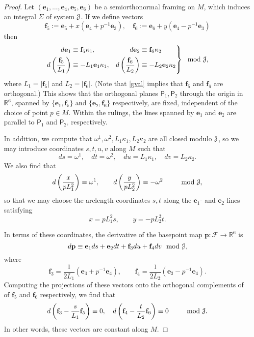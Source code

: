 \documentclass[12pt,reqno]{amsart}
\theoremstyle{definition}
\theoremstyle{remark}
\begin{document}
\begin{proof}
 Let $({\mathbf e}_1, \ldots, {\mathbf e}_4, {\mathbf e}_5, {\mathbf e}_6)$ be a semiorthonormal
framing on $M$, which induces an integral $\Sigma$ of system ${{\EuScript J}}$.
If we define vectors
$${\mathbf f}_5:={\mathbf e}_5 + x({\mathbf e}_4+p^{-1}{\mathbf e}_3),\quad {\mathbf f}_6:= {\mathbf e}_6+y({\mathbf e}_4-p^{-1}{\mathbf e}_3)$$
then
$$\left.
\begin{aligned}
d{\mathbf e}_1 &\equiv {\mathbf f}_5 \kappa_1, & d{\mathbf e}_2 &\equiv {\mathbf f}_6 \kappa_2\\
d\left(\dfrac{{\mathbf f}_5}{L_1}\right) &\equiv -L_1 {\mathbf e}_1 \kappa_1, &
d\left(\dfrac{{\mathbf f}_6}{L_2}\right) &\equiv -L_2 {\mathbf e}_2 \kappa_2
\end{aligned}\right\} \mod {{\EuScript J}},
$$
where $L_1 = |{\mathbf f}_5|$ and $L_2 = |{\mathbf f}_6|$.  (Note that
\eqref{gval} implies that ${\mathbf f}_5$ and ${\mathbf f}_6$ are orthogonal.)
This shows that the orthogonal
planes ${\mathsf P}_1, {\mathsf P}_2$ through the origin in ${\mathbb R}^6$, spanned by $\{{\mathbf e}_1, {\mathbf f}_5\}$ and $\{{\mathbf e}_2, {\mathbf f}_6\}$
respectively, are fixed, independent of the choice of point $p\in M$.  Within the rulings,
the lines spanned by ${\mathbf e}_1$ and ${\mathbf e}_2$ are parallel to ${\mathsf P}_1$ and ${\mathsf P}_2$, respectively.

In addition, we compute that ${\omega}^1, {\omega}^2, L_1\kappa_1, L_2 \kappa_2$ are all closed
modulo ${{\EuScript J}}$, so we may introduce coordinates $s,t,u,v$ along $M$ such that
$$ds = {\omega}^1, \quad dt = {\omega}^2, \quad du = L_1\kappa_1, \quad dv=L_2\kappa_2.$$
We also find that
$$d\left(\dfrac{x}{p L_1^2}\right) \equiv {\omega}^1, \qquad d\left(\dfrac{y}{p L_2^2}\right)\equiv -{\omega}^2\qquad
\mod {{\EuScript J}},$$
so that we may choose the arclength coordinates $s,t$ along the ${\mathbf e}_1$- and ${\mathbf e}_2$-lines
satisfying
$$x=p L_1^2 s, \qquad y = -p L_2^2 t.$$

In terms of these coordinates, the derivative of the basepoint
map ${\mathbf p}:{\mathscr F} \to {\mathbb R}^6$ is
\begin{equation}\label{deep}
d{\mathbf p} \equiv {\mathbf e}_1 ds + {\mathbf e}_2 dt + {\mathbf f}_3 du + {\mathbf f}_4 dv
\mod {{\EuScript J}},\end{equation}
where
$${\mathbf f}_3 = \dfrac1{2L_1}({\mathbf e}_3 + p^{-1}{\mathbf e}_4), \qquad {\mathbf f}_4 = \dfrac1{2L_2}({\mathbf e}_3 -p^{-1}{\mathbf e}_4).$$
Computing the projections of these vectors onto the orthogonal complements of
of ${\mathbf f}_5$ and ${\mathbf f}_6$ respectively, we find that
$$d\left({\mathbf f}_3 - \dfrac{s}{L_1} {\mathbf f}_5\right) \equiv 0, \quad
d\left({\mathbf f}_4 - \dfrac{t}{L_2}{\mathbf f}_6\right)\equiv 0\qquad \mod {{\EuScript J}}.$$
In other words, these vectors are constant along $M$.


\end{proof}
\end{document}
